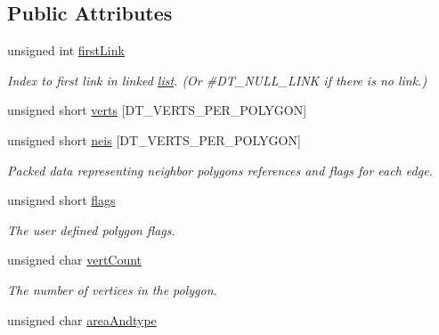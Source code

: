 \subsection*{Public Attributes}
\begin{DoxyCompactItemize}
\item 
\mbox{\label{structdtPoly_a671fd6893087936e80fcd17f7f666c0e}} 
unsigned int \hyperlink{structdtPoly_a671fd6893087936e80fcd17f7f666c0e}{first\+Link}
\begin{DoxyCompactList}\small\item\em Index to first link in linked \hyperlink{protocollist-p}{list}. (Or \#\+D\+T\+\_\+\+N\+U\+L\+L\+\_\+\+L\+I\+NK if there is no link.) \end{DoxyCompactList}\item 
unsigned short \hyperlink{structdtPoly_acbba5c3a3786095481c087a1963e20b5}{verts} \mbox{[}D\+T\+\_\+\+V\+E\+R\+T\+S\+\_\+\+P\+E\+R\+\_\+\+P\+O\+L\+Y\+G\+ON\mbox{]}
\item 
unsigned short \hyperlink{structdtPoly_ac4f5aa32df32aa5b1385f76f697376af}{neis} \mbox{[}D\+T\+\_\+\+V\+E\+R\+T\+S\+\_\+\+P\+E\+R\+\_\+\+P\+O\+L\+Y\+G\+ON\mbox{]}
\begin{DoxyCompactList}\small\item\em Packed data representing neighbor polygons references and flags for each edge. \end{DoxyCompactList}\item 
\mbox{\label{structdtPoly_a47312e2c5dfd1ff1a729580c339f0d7d}} 
unsigned short \hyperlink{structdtPoly_a47312e2c5dfd1ff1a729580c339f0d7d}{flags}
\begin{DoxyCompactList}\small\item\em The user defined polygon flags. \end{DoxyCompactList}\item 
\mbox{\label{structdtPoly_af940c431464c022f844e61130f83d9c2}} 
unsigned char \hyperlink{structdtPoly_af940c431464c022f844e61130f83d9c2}{vert\+Count}
\begin{DoxyCompactList}\small\item\em The number of vertices in the polygon. \end{DoxyCompactList}\item 
unsigned char \hyperlink{structdtPoly_af3caa090f5d4776766bf56f82c27a899}{area\+Andtype}
\end{DoxyCompactItemize}


